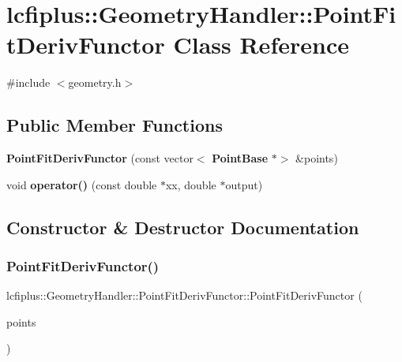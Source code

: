 \section{lcfiplus\+:\+:Geometry\+Handler\+:\+:Point\+Fit\+Deriv\+Functor Class Reference}
\label{classlcfiplus_1_1GeometryHandler_1_1PointFitDerivFunctor}


{\ttfamily \#include $<$geometry.\+h$>$}

\subsection*{Public Member Functions}
\begin{DoxyCompactItemize}
\item 
\textbf{ Point\+Fit\+Deriv\+Functor} (const vector$<$ \textbf{ Point\+Base} $\ast$$>$ \&points)
\item 
void \textbf{ operator()} (const double $\ast$xx, double $\ast$output)
\end{DoxyCompactItemize}


\subsection{Constructor \& Destructor Documentation}
\mbox{\label{classlcfiplus_1_1GeometryHandler_1_1PointFitDerivFunctor_a9519accdc80e9ff8f54777c37de677c5}} 
\subsubsection{Point\+Fit\+Deriv\+Functor()}
{\footnotesize\ttfamily lcfiplus\+::\+Geometry\+Handler\+::\+Point\+Fit\+Deriv\+Functor\+::\+Point\+Fit\+Deriv\+Functor (\begin{DoxyParamCaption}\item[{const vector$<$ \textbf{ Point\+Base} $\ast$$>$ \&}]{points }\end{DoxyParamCaption})\hspace{0.3cm}{\ttfamily [inline]}}




